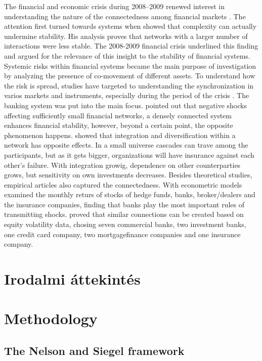 \documentclass{article}
\begin{document}
The financial and economic crisis during 2008–2009 renewed interest in understanding the nature of the connectedness among financial markets \cite{aloui2011global}. The attention first turned towards systems when \cite{may1972will} showed that complexity can actually undermine stability. His analysis proves that networks with a larger number of interactions were less stable. The 2008-2009 financial crisis underlined this finding and \cite{haldane2011systemic} argued for the relevance of this insight to the stability of financial systems. Systemic risks within financial systems became the main purpose of investigation by analyzing the presence of co-movement of different assets. To understand how the risk is spread, studies have targeted to understanding the synchronization in varios markets and instruments, especially during the period of the crisis \cite{bisias2012survey}. The banking system was put into the main focus. \cite{acemoglu2015systemic} pointed out that negative shocks affecting sufficiently small financial networks, a densely connected system enhances financial stability, however, beyond a certain point, the opposite phenomenon happens.  \cite{elliott2014financial} showed that integration and diversification within a network has opposite effects. In a small universe cascades can trave among the participants, but as it gets bigger, organizations will have insurance against each other’s failure. With integration growig, dependence on other counterparties grows, but sensitivity on own investments decreases. Besides theoretical studies, empirical articles also captured the connectedness. With econometric models \cite{billio2012econometric} examined the monthly returs of stocks of hedge funds, banks, broker/dealers and the insurance companies, finding that banks play the most important rules of transmitting shocks. \cite{diebold2014network} proved that similar connections can be created based on equity volatility data, chosing seven commercial banks, two investment banks, one credit card company, two mortgagefinance companies and one insurance company.

\section{Irodalmi áttekintés}

\section{Methodology}
\noindent
\subsection{The Nelson and Siegel framework}
\end{document}

